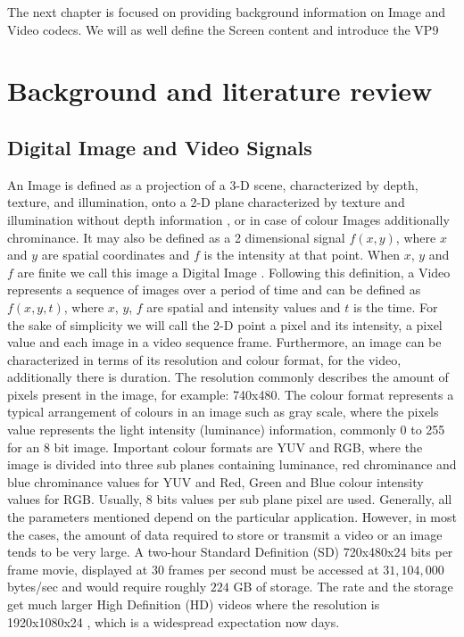 \documentclass[a4paper,11pt,oneside]{article}
\begin{document}
\indent The next chapter is focused on providing background information on Image and Video codecs. We will as well define the Screen content and introduce the VP9 \\

\newpage
\section{Background and literature review}
\subsection{Digital Image and Video Signals}
\indent An Image is defined as a projection of a 3-D scene, characterized by depth, texture, and illumination, onto a 2-D plane characterized by texture and illumination without depth information \cite[pp.~5]{richardson2002video}, or in case of colour Images additionally chrominance. It may also be defined as a 2 dimensional signal $ f(x, y) $, where $x$ and $y$ are spatial coordinates and $f$ is the intensity at that point. When $x$, $y$ and $f$ are finite we call this image a Digital Image \cite[ppp.~1]{gonzalez2008digital}. 
Following this definition, a Video represents a sequence of images over a period of time and can be defined as $f(x,y,t)$, where $x$, $y$, $f$ are spatial and intensity values and $t$ is the time.
For the sake of simplicity we will call the 2-D point a pixel and its intensity, a pixel value and each image in a video sequence frame.
Furthermore, an image can be characterized in terms of its resolution and colour format, for the video, additionally there is duration. The resolution commonly describes the amount of pixels present in the image, for example: 740x480. The colour format represents a typical arrangement of colours in an image such as gray scale, where the pixels value represents the light intensity (luminance) information, commonly 0 to 255 for an 8 bit image. Important colour formats are YUV and RGB, where the image is divided into three sub planes containing luminance, red chrominance and blue chrominance values for YUV and Red, Green and Blue colour intensity values for RGB. Usually, 8 bits values per sub plane pixel are used. Generally, all the parameters mentioned depend on the particular application. However, in most the cases, the amount of data required to store or transmit a video or an image tends to be very large. A two-hour Standard Definition (SD) 720x480x24 bits per frame movie, displayed at 30 frames per second must be accessed at $ 31,104,000 $ bytes/sec and would require roughly $224$ GB of storage. The rate and the storage get much larger High Definition (HD) videos where the resolution is 1920x1080x24 \cite[pp.~525-526]{gonzalez2008digital}, which is a widespread expectation now days. \\
\end{document}
